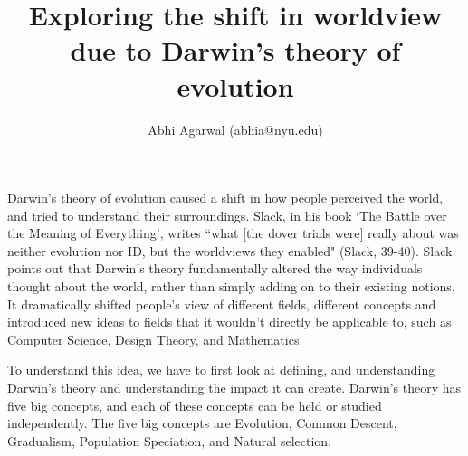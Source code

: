 \documentclass[11pt, oneside]{article}
\title{Exploring the shift in worldview due to Darwin's theory of evolution}
\author{Abhi Agarwal (abhia@nyu.edu)}
\date{}
\begin{document}
\maketitle



\par Darwin's theory of evolution caused a shift in how people perceived the world, and tried to understand their surroundings. Slack, in his book `The Battle over the Meaning of Everything', writes ``what [the dover trials were] really about was neither evolution nor ID, but the worldviews they enabled" (Slack, 39-40). Slack points out that Darwin's theory fundamentally altered the way individuals thought about the world, rather than simply adding on to their existing notions. It dramatically shifted people's view of different fields, different concepts and introduced new ideas to fields that it wouldn't directly be applicable to, such as Computer Science, Design Theory, and Mathematics. 


\par To understand this idea, we have to first look at defining, and understanding Darwin's theory and understanding the impact it can create. Darwin's theory has five big concepts, and each of these concepts can be held or studied independently. The five big concepts are Evolution, Common Descent, Gradualism, Population Speciation, and Natural selection. 
\end{document}
